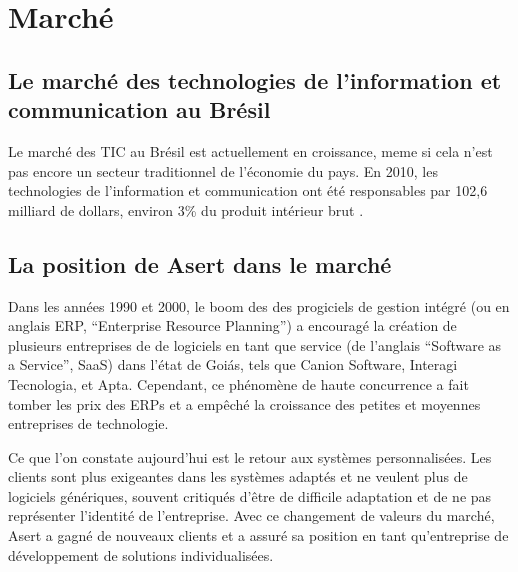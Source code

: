 \section{Marché}
\subsection{Le marché des technologies de l'information et communication au Brésil}

Le marché des TIC au Brésil est actuellement en croissance, meme si cela n'est pas encore un secteur traditionnel de l'économie du pays. En 2010, les technologies de l'information et communication ont été responsables par 102,6 milliard de dollars, environ 3\% \cite{pib-brasil} du produit intérieur brut \cite{uol-mercado-tic}.



\subsection{La position de Asert dans le marché}

Dans les années 1990 et 2000, le boom des des progiciels de gestion intégré (ou en anglais ERP,  ``Enterprise Resource Planning'') a encouragé la création de plusieurs entreprises de de logiciels en tant que service (de l'anglais ``Software as a Service'', SaaS) dans l'état de Goiás, tels que Canion Software, Interagi Tecnologia, et Apta. Cependant, ce phénomène de haute concurrence a fait tomber les prix des ERPs et a empêché la croissance des petites et moyennes entreprises de technologie.

Ce que l'on constate aujourd'hui est le retour aux systèmes personnalisées. Les clients sont plus exigeantes dans les systèmes adaptés et ne veulent plus de logiciels génériques, souvent critiqués d'être de difficile adaptation et de ne pas représenter l'identité de l'entreprise. Avec ce changement de valeurs du marché, Asert a gagné de nouveaux clients et a assuré sa position en tant qu'entreprise de développement de solutions individualisées.


